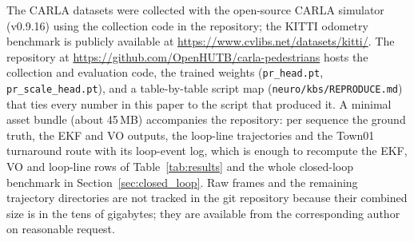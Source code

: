 \documentclass[review,12pt]{elsarticle}
\begin{document}
The CARLA datasets were collected with the open-source CARLA simulator (v0.9.16) using the collection code in the repository; the KITTI odometry benchmark is publicly available at \url{https://www.cvlibs.net/datasets/kitti/}. The repository at \url{https://github.com/OpenHUTB/carla-pedestrians} hosts the collection and evaluation code, the trained weights (\texttt{pr\_head.pt}, \texttt{pr\_scale\_head.pt}), and a table-by-table script map (\texttt{neuro/kbs/REPRODUCE.md}) that ties every number in this paper to the script that produced it. A minimal asset bundle (about 45\,MB) accompanies the repository: per sequence the ground truth, the EKF and VO outputs, the loop-line trajectories and the Town01 turnaround route with its loop-event log, which is enough to recompute the EKF, VO and loop-line rows of Table~\ref{tab:results} and the whole closed-loop benchmark in Section~\ref{sec:closed_loop}. Raw frames and the remaining trajectory directories are not tracked in the git repository because their combined size is in the tens of gigabytes; they are available from the corresponding author on reasonable request.



\end{document}
